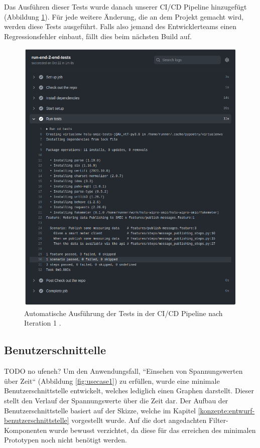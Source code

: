 Das Ausführen dieser Tests wurde danach unserer \ac{CI/CD} Pipeline hinzugefügt (Abbildung \ref{fig:test-iteration-1}).
Für jede weitere Änderung, die an dem Projekt gemacht wird, werden diese Tests ausgeführt.
Falls also jemand des Entwicklerteams einen Regressionsfehler einbaut, fällt dies beim nächsten Build auf.

\begin{figure}[h]
    \centering
    \includegraphics[width=1.0\textwidth]{gfx/testlog-iteration-0}
    \caption{
        Automatische Ausführung der Tests in der \ac{CI/CD} Pipeline nach Iteration 1 \parencite{randombenj_testlog_it_0_2021}.
    }
    \label{fig:test-iteration-1}
\end{figure}

\subsection{Benutzerschnittelle} TODO no ufeneh?
Um den Anwendungsfall, ``Einsehen von Spannungswerten über Zeit`` (Abbildung \ref{fig:usecase1}) zu erfüllen,
wurde eine minimale Benutzerschnittstelle entwickelt, welches lediglich einen Graphen darstellt.
Dieser stellt den Verlauf der Spannungswerte über die Zeit dar.
Der Aufbau der Benutzerschnittstelle basiert auf der Skizze,
welche im Kapitel \ref{konzepte:entwurf-benutzerschnittstelle} vorgestellt wurde.
Auf die dort angedachten Filter-Komponenten wurde bewusst verzichtet, da diese für das erreichen des
minimalen Prototypen noch nicht benötigt werden.

